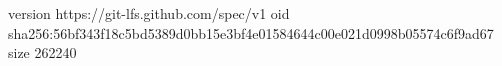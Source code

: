 version https://git-lfs.github.com/spec/v1
oid sha256:56bf343f18c5bd5389d0bb15e3bf4e01584644c00e021d0998b05574c6f9ad67
size 262240
